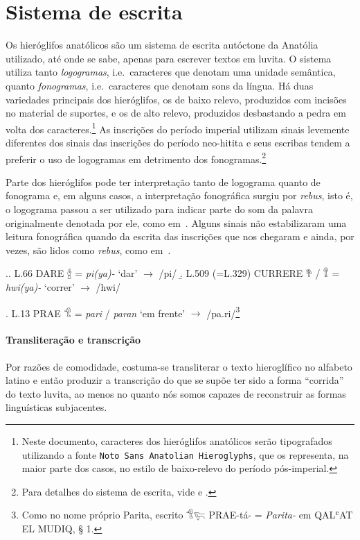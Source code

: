 
\section{Sistema de escrita}

Os hieróglifos anatólicos são um sistema de escrita autóctone da Anatólia
utilizado, até onde se sabe, apenas para escrever textos em luvita.
O sistema utiliza tanto \emph{logogramas}, i.e.\ caracteres que denotam uma
unidade semântica, quanto \emph{fonogramas}, i.e.\ caracteres que denotam sons da
língua.
Há duas variedades principais dos hieróglifos, os de baixo relevo, produzidos
com incisões no material de suportes, e os de alto relevo, produzidos
desbastando a pedra em volta dos caracteres.\footnote{Neste documento,
	caracteres dos hieróglifos anatólicos serão tipografados utilizando a fonte
		{\tiny\texttt{Noto Sans Anatolian Hieroglyphs}}, que os representa, na
	maior parte dos casos, no estilo de
	baixo-relevo do período pós\hyp{}imperial.}
As inscrições do período imperial utilizam sinais levemente diferentes dos
sinais das inscrições do período neo-hitita e seus escribas tendem a preferir
o uso de logogramas em detrimento dos fonogramas.\footnote{%
	Para detalhes do sistema de escrita, vide
	\citet[pp.\ 6ff.\ e pp.\ 23ff.]{CHLI11} e \citet[pp. 354ff.]{CHLI3}.
}


Parte dos hieróglifos pode ter interpretação tanto de logograma quanto de
fonograma e, em alguns casos, a interpretação fonográfica surgiu por
\emph{rebus}, isto é, o logograma passou a ser utilizado para indicar parte do
som da palavra originalmente denotada por ele, como em~\Next.
Alguns sinais não estabilizaram uma leitura fonográfica quando da escrita das
inscrições que nos chegaram e ainda, por vezes, são lidos como \emph{rebus},
como em~\NNext.

\ex.\a. L.66 DARE 𔑈 = \emph{pi{(ya)}-} `dar' $\rightarrow$ /pi/
\b. L.509 (=L.329) CURRERE 𔘰 \slash{} 𔕰 = \emph{hwi{(ya)}-} `correr' $\rightarrow$
/hwi/

\ex. L.13 PRAE 𔐎 = \emph{pari} \slash{} \emph{paran} `em frente' $\rightarrow$
/pa.ri/\footnote{Como no nome próprio Parita, escrito 𔐎𔐞 PRAE-tá- =
	\emph{Parita-} em QALʿAT EL MUDIQ, § 1.}

\paragraph{Transliteração e transcrição}
Por razões de comodidade, costuma-se transliterar o texto hieroglífico no
alfabeto latino e então produzir a transcrição do que se supõe ter sido a
forma ``corrida'' do texto luvita, ao menos no quanto nós somos capazes de
reconstruir as formas linguísticas subjacentes.

